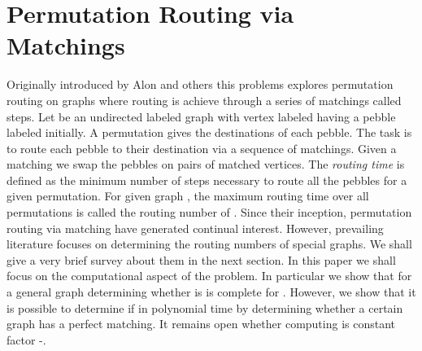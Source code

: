 \documentclass[runningheads,a4paper]{llncs}
\begin{document}
\section{Permutation Routing via Matchings}
Originally introduced by Alon and others \cite{5} this problems explores permutation routing on graphs where routing is achieve through a  series of matchings called steps. Let  be an undirected labeled graph with vertex labeled  having a pebble labeled  initially. A permutation  gives the destinations of each pebble. The task is to route each pebble to their destination via a sequence of matchings. Given a matching we swap the pebbles on pairs of matched vertices. The \textit{routing time}  is defined as the minimum number of steps necessary to route all the pebbles for a given permutation. For given graph , the maximum routing time over all permutations is called  the routing number  of . Since their inception, permutation routing via matching have generated continual interest. However, prevailing literature focuses on determining the routing numbers of special graphs. We shall give a very brief survey about them in the next section. In this paper we shall focus on the computational aspect of the problem. In particular  we show that for a general graph determining whether  is  is  complete for . However, we show that it is possible to determine if  in polynomial time by determining whether a certain graph has a perfect matching. It remains open whether computing  is constant factor -.
\end{document}
